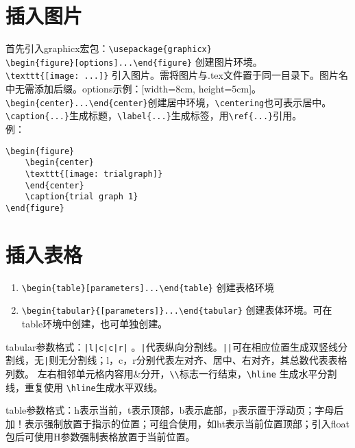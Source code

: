\documentclass[a4paper,10pt]{ctexart}
\begin{document}
\section{插入图片}
\noindent
首先引入graphicx宏包：\verb|\usepackage{graphicx}| \\
\verb|\begin{figure}[options]...\end{figure}| 创建图片环境。\\
\verb|\texttt{[image: ...]}| 引入图片。需将图片与.tex文件置于同一目录下。图片名中无需添加后缀。options示例：[width=8cm, height=5cm]。\\
\verb|\begin{center}...\end{center}|创建居中环境，\verb|\centering|也可表示居中。\\
\verb|\caption{...}|生成标题，\verb|\label{...}|生成标签，用\verb|\ref{...}|引用。\\


例：
\begin{verbatim}
\begin{figure}
	\begin{center}
	\texttt{[image: trialgraph]}
	\end{center}
	\caption{trial graph 1}
\end{figure}
\end{verbatim}


\section{插入表格}
\noindent
\begin{enumerate}
	\item \verb|\begin{table}[parameters]...\end{table}| 
	创建表格环境
	\item \verb|\begin{tabular}{[parameters]}...\end{tabular}| 
	创建表体环境。可在table环境中创建，也可单独创建。
\end{enumerate}

tabular参数格式：\verb'|l|c|c|r|' 。\verb'|'代表纵向分割线。\verb'||'可在相应位置生成双竖线分割线，无\verb'|'则无分割线；l，c，r分别代表左对齐、居中、右对齐，其总数代表表格列数。
左右相邻单元格内容用\&分开，\verb|\\|标志一行结束，\verb|\hline| 生成水平分割线，重复使用
\verb|\hline|生成水平双线。

table参数格式：h表示当前，t表示顶部，b表示底部，p表示置于浮动页；字母后加！表示强制放置于指示的位置；可组合使用，如ht表示当前位置顶部；引入float包后可使用H参数强制表格放置于当前位置。
\end{document}
